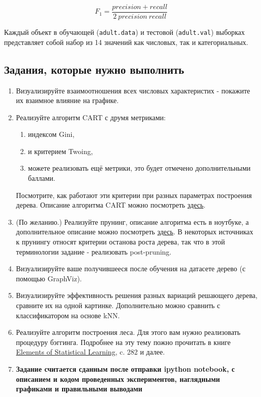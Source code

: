 \documentclass[a4paper, 12pt]{article}
\begin{document}
$$F_1 = \frac{precision + recall}{2~ precision ~recall}$$

Каждый объект в обучающей (\texttt{adult.data}) и тестовой (\texttt{adult.val}) выборках представляет собой набор из 14 значений как числовых, так и категориальных. 

\subsection*{Задания, которые нужно выполнить}
\begin{enumerate}
	\item Визуализируйте взаимоотношения всех числовых характеристих - покажите их взаимное влияние на графике. 
	\item Реализуйте алгоритм CART с друмя метриками:
      \begin{enumerate}
          \item индексом Gini,
          \item и критерием Twoing,
          \item можете реализовать ещё метрики, это будет отмечено дополнительными баллами.
      \end{enumerate}
Посмотрите, как работают эти критерии при разных параметрах построения дерева. Описание алгоритма CART можно посмотреть \href{ftp://public.dhe.ibm.com/software/analytics/spss/support/Stats/Docs/Statistics/Algorithms/13.0/TREE-CART.pdf}{здесь}.
    
    \item (По желанию.) Реализуйте прунинг, описание алгоритма есть в ноутбуке, а дополнительное описание можно посмотреть \href{http://www.dcc.fc.up.pt/~ltorgo/PhD/th4.pdf}{здесь}.
    В некоторых источниках к прунингу относят критерии останова роста дерева, так что в этой терминологии задание - реализовать post-pruning. 
    \item Визуализируйте ваше получившееся после обучения на датасете дерево (с помощью GraphViz).
    \item Визуализируйте эффективность решения разных вариаций решающего дерева, сравните их на одной картинке. Дополнительно можно сравнить с классификатором на основе kNN.
    \item Реализуйте алгоритм построения леса. Для этого вам нужно реализовать процедуру бэггинга. Подробнее на эту тему пожно прочитать в книге \href{https://web.stanford.edu/~hastie/local.ftp/Springer/OLD/ESLII_print4.pdf}{Elements of Statistical Learning}, c. 282 и далее.
    \item \textbf{Задание считается сданным после отправки ipython notebook, с описанием и кодом проведенных экспериментов, наглядными графиками и правильными выводами} 
\end{enumerate}
\end{document}
